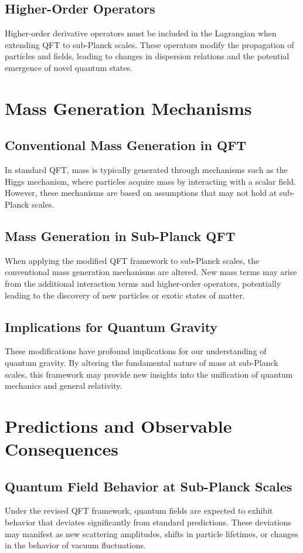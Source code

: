\documentclass{article}
\begin{document}
\subsection{Higher-Order Operators}
Higher-order derivative operators must be included in the Lagrangian when extending QFT to sub-Planck scales. These operators modify the propagation of particles and fields, leading to changes in dispersion relations and the potential emergence of novel quantum states.

\section{Mass Generation Mechanisms}

\subsection{Conventional Mass Generation in QFT}
In standard QFT, mass is typically generated through mechanisms such as the Higgs mechanism, where particles acquire mass by interacting with a scalar field. However, these mechanisms are based on assumptions that may not hold at sub-Planck scales.

\subsection{Mass Generation in Sub-Planck QFT}
When applying the modified QFT framework to sub-Planck scales, the conventional mass generation mechanisms are altered. New mass terms may arise from the additional interaction terms and higher-order operators, potentially leading to the discovery of new particles or exotic states of matter.

\subsection{Implications for Quantum Gravity}
These modifications have profound implications for our understanding of quantum gravity. By altering the fundamental nature of mass at sub-Planck scales, this framework may provide new insights into the unification of quantum mechanics and general relativity.

\section{Predictions and Observable Consequences}

\subsection{Quantum Field Behavior at Sub-Planck Scales}
Under the revised QFT framework, quantum fields are expected to exhibit behavior that deviates significantly from standard predictions. These deviations may manifest as new scattering amplitudes, shifts in particle lifetimes, or changes in the behavior of vacuum fluctuations.
\end{document}
